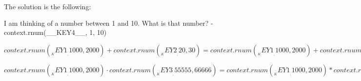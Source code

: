 The solution is the following:
\begin{solution}
\item I am thinking of a number between 1 and 10. What is that number? - {{context.rnum(__KEY4__, 1, 10)}}  
\item ${{context.rnum(__KEY1__, 1000, 2000)}} + {{context.rnum(__KEY2__, 20, 30)}} = {{context.rnum(__KEY1__, 1000, 2000) + context.rnum(__KEY2__, 20, 30)}}$ 
\item ${{context.rnum(__KEY1__, 1000, 2000)}} \cdot {{context.rnum(__KEY3__, 55555, 66666)}} = {{context.rnum(__KEY1__, 1000, 2000) * context.rnum(__KEY3__, 55555, 66666)}}$ 
\end{solution}